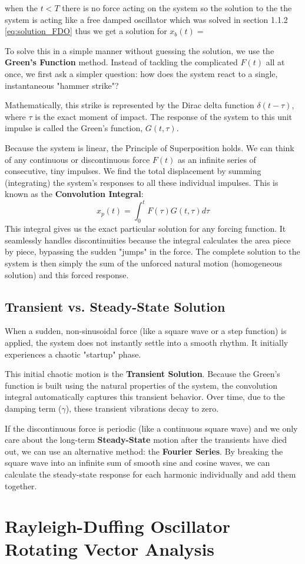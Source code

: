 \documentclass[10pt,twoside]{report}
\begin{document}
when the $t<T$ there is no force acting on the system so the solution to the 
the system is acting like a free damped oscillator which was solved in section 1.1.2 \eqref{eq:solution_FDO}
thus we get a solution for $x_b(t) = $




To solve this in a simple manner without guessing the solution, we use the \textbf{Green's Function} method. Instead of tackling the complicated $F(t)$ all at once, we first ask a simpler question: how does the system react to a single, instantaneous "hammer strike"?

Mathematically, this strike is represented by the Dirac delta function $\delta(t-\tau)$, where $\tau$ is the exact moment of impact. The response of the system to this unit impulse is called the Green's function, $G(t, \tau)$.

Because the system is linear, the Principle of Superposition holds. We can think of any continuous or discontinuous force $F(t)$ as an infinite series of consecutive, tiny impulses. We find the total displacement by summing (integrating) the system's responses to all these individual impulses. This is known as the \textbf{Convolution Integral}:
\begin{equation*}
    x_p(t) = \int_{0}^{t} F(\tau) G(t, \tau) d\tau
\end{equation*}
This integral gives us the exact particular solution for any forcing function. It seamlessly handles discontinuities because the integral calculates the area piece by piece, bypassing the sudden "jumps" in the force. The complete solution to the system is then simply the sum of the unforced natural motion (homogeneous solution) and this forced response.


\subsection{Transient vs. Steady-State Solution}
When a sudden, non-sinusoidal force (like a square wave or a step function) is applied, the system does not instantly settle into a smooth rhythm. It initially experiences a chaotic "startup" phase. 

This initial chaotic motion is the \textbf{Transient Solution}. Because the Green's function is built using the natural properties of the system, the convolution integral automatically captures this transient behavior. Over time, due to the damping term ($\gamma$), these transient vibrations decay to zero.

If the discontinuous force is periodic (like a continuous square wave) and we
 only care about the long-term \textbf{Steady-State} motion after the transients
  have died out, we can use an alternative method: the \textbf{Fourier Series}. 
By breaking the square wave into an infinite sum of smooth sine and cosine waves, we can calculate the steady-state response for each harmonic individually and add them together.


\section{Rayleigh-Duffing Oscillator Rotating Vector Analysis}
\end{document}
